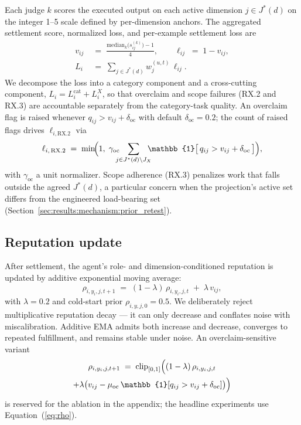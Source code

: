 Each judge $k$ scores the executed output on each active dimension $j \in J^*(d)$ on the integer 1--5 scale defined by per-dimension anchors. The aggregated settlement score, normalized loss, and per-example settlement loss are
\begin{align}
v_{ij} \;&=\; \frac{\mathrm{median}_k\bigl(s_{ij}^{(k)}\bigr) - 1}{4},
\qquad
\ell_{ij} \;=\; 1 - v_{ij}, \nonumber \\
L_i \;&=\; \sum_{j \in J^*(d)} w_j^{(u, t)}\, \ell_{ij}.
\label{eq:settlement}
\end{align}
We decompose the loss into a category component and a cross-cutting component, $L_i = L_i^{\text{cat}} + L_i^{X}$, so that overclaim and scope failures (RX.2 and RX.3) are accountable separately from the category-task quality. An overclaim flag is raised whenever $q_{ij} > v_{ij} + \delta_{\text{oc}}$ with default $\delta_{\text{oc}} = 0.2$; the count of raised flags drives $\ell_{i, \text{RX.2}}$ via
\begin{equation}
\ell_{i,\,\text{RX.2}} \;=\; \min\!\Bigl( 1,\; \gamma_{\text{oc}} \!\!\!\! \sum_{j \in J^*(d) \setminus J_X} \!\!\!\! \mathbb{1}\bigl[\, q_{ij} > v_{ij} + \delta_{\text{oc}} \,\bigr] \Bigr),
\label{eq:overclaim}
\end{equation}
with $\gamma_{\text{oc}}$ a unit normalizer. Scope adherence (RX.3) penalizes work that falls outside the agreed $J^*(d)$, a particular concern when the projection's active set differs from the engineered load-bearing set (Section~\ref{sec:results:mechanism:prior_retest}).

\subsection{Reputation update}
\label{sec:protocol:reputation}

After settlement, the agent's role- and dimension-conditioned reputation is updated by additive exponential moving average:
\begin{equation}
\rho_{i, y_i, j, t+1} \;=\; (1 - \lambda)\, \rho_{i, y_i, j, t} \;+\; \lambda\, v_{ij},
\label{eq:rho}
\end{equation}
with $\lambda = 0.2$ and cold-start prior $\rho_{i, y, j, 0} = 0.5$.
We deliberately reject multiplicative reputation decay --- it can only decrease and conflates noise with miscalibration. Additive EMA admits both increase and decrease, converges to repeated fulfillment, and remains stable under noise. An overclaim-sensitive variant
\begin{multline}
\rho_{i, y_i, j, t+1} \;=\; \mathrm{clip}_{[0,1]}\Bigl( (1 - \lambda)\, \rho_{i, y_i, j, t} \\
+ \lambda \bigl( v_{ij} - \mu_{\text{oc}}\, \mathbb{1}[q_{ij} > v_{ij} + \delta_{\text{oc}}] \bigr) \Bigr)
\label{eq:rho_oc}
\end{multline}
is reserved for the ablation in the appendix; the headline experiments use Equation~(\ref{eq:rho}).

